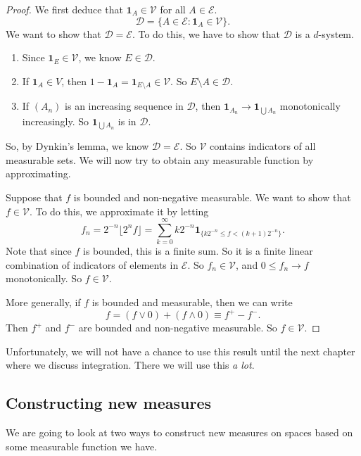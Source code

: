 \documentclass[a4paper]{article}
\begin{document}
\begin{proof}
  We first deduce that $\mathbf{1}_A \in \mathcal{V}$ for all $A \in \mathcal{E}$.
  \[
    \mathcal{D} = \{A \in \mathcal{E}: \mathbf{1}_A \in \mathcal{V}\}.
  \]
  We want to show that $\mathcal{D} = \mathcal{E}$. To do this, we have to show that $\mathcal{D}$ is a $d$-system.
  \begin{enumerate}
    \item Since $\mathbf{1}_E \in \mathcal{V}$, we know $E \in \mathcal{D}$.
    \item If $\mathbf{1}_A \in V$, then $1 - \mathbf{1}_A = \mathbf{1}_{E \setminus A} \in \mathcal{V}$. So $E \setminus A \in \mathcal{D}$.
    \item If $(A_n)$ is an increasing sequence in $\mathcal{D}$, then $\mathbf{1}_{A_n} \to \mathbf{1}_{\bigcup A_n}$ monotonically increasingly. So $\mathbf{1}_{\bigcup A_n}$ is in $\mathcal{D}$.
  \end{enumerate}
  So, by Dynkin's lemma, we know $\mathcal{D} = \mathcal{E}$. So $\mathcal{V}$ contains indicators of all measurable sets. We will now try to obtain any measurable function by approximating.

  Suppose that $f$ is bounded and non-negative measurable. We want to show that $f \in \mathcal{V}$. To do this, we approximate it by letting
  \[
    f_n = 2^{-n} \lfloor 2^n f\rfloor = \sum_{k = 0}^\infty k 2^{-n} \mathbf{1}_{\{k 2^{-n} \leq f < (k + 1) 2^{-n}\}}.
  \]
  Note that since $f$ is bounded, this is a finite sum. So it is a finite linear combination of indicators of elements in $\mathcal{E}$. So $f_n \in \mathcal{V}$, and $0 \leq f_n \to f$ monotonically. So $f \in \mathcal{V}$.

  More generally, if $f$ is bounded and measurable, then we can write
  \[
    f = (f \vee 0) + (f \wedge 0) \equiv f^+ - f^-.
  \]
  Then $f^+$ and $f^-$ are bounded and non-negative measurable. So $f \in \mathcal{V}$.
\end{proof}

Unfortunately, we will not have a chance to use this result until the next chapter where we discuss integration. There we will use this \emph{a lot}.

\subsection{Constructing new measures}
We are going to look at two ways to construct new measures on spaces based on some measurable function we have.
\end{document}
